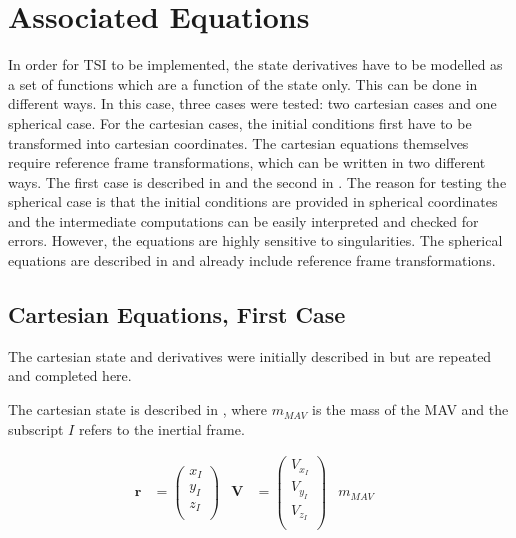 \section{Associated Equations}
\label{sec:assEq}
In order for \ac{TSI} to be implemented, the state derivatives have to be modelled as a set of functions which are a function of the state only. This can be done in different ways. In this case, three cases were tested: two cartesian cases and one spherical case. For the cartesian cases, the initial conditions first have to be transformed into cartesian coordinates. The cartesian equations themselves require reference frame transformations, which can be written in two different ways. The first case is described in  and the second in . The reason for testing the spherical case is that the initial conditions are provided in spherical coordinates and the intermediate computations can be easily interpreted and checked for errors. However, the equations are highly sensitive to singularities. The spherical equations are described in  and already include reference frame transformations. 

\subsection{Cartesian Equations, First Case}
\label{subsec:careq}
The cartesian state and derivatives were initially described in  but are repeated and completed here.

The cartesian state is described in , where $m_{MAV}$ is the mass of the \ac{MAV} and the subscript $I$ refers to the inertial frame.

\begin{align} \label{eq:state}
\mathbf{r}&=\begin{pmatrix}
x_{I}\\
y_{I}\\
z_{I}\\
\end{pmatrix}
&
\mathbf{V}&=\begin{pmatrix}
V_{x_{I}} \\
V_{y_{I}} \\
V_{z_{I}}\\
\end{pmatrix}
&
m_{MAV}&
\end{align}



